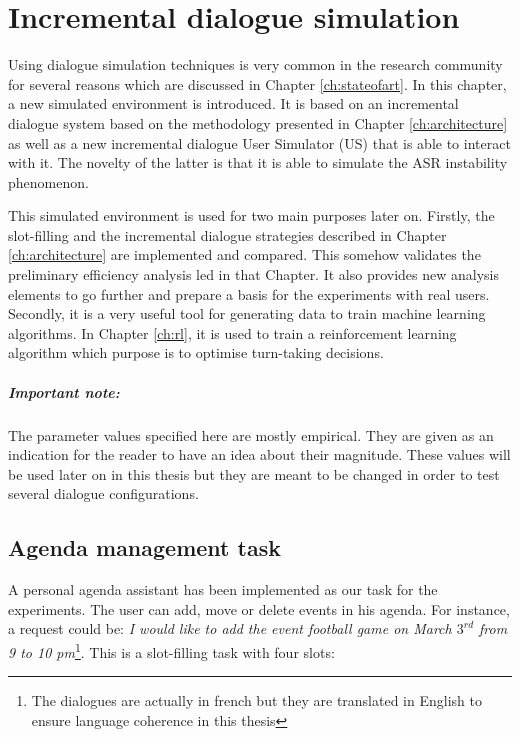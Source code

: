 \chapter{Incremental dialogue simulation}
\label{ch:simulation}
	
	Using dialogue simulation techniques is very common in the research community \cite{Eckert1997,Pietquin2013} for several reasons which are discussed in Chapter \ref{ch:stateofart}. In this chapter, a new simulated environment is introduced. It is based on an incremental dialogue system based on the methodology presented in Chapter \ref{ch:architecture} as well as a new incremental dialogue User Simulator (US) that is able to interact with it. The novelty of the latter is that it is able to simulate the ASR instability phenomenon.
	
	This simulated environment is used for two main purposes later on. Firstly, the slot-filling and the incremental dialogue strategies described in Chapter \ref{ch:architecture} are implemented and compared. This somehow validates the preliminary efficiency analysis led in that Chapter. It also provides new analysis elements to go further and prepare a basis for the experiments with real users. Secondly, it is a very useful tool for generating data to train machine learning algorithms. In Chapter \ref{ch:rl}, it is used to train a reinforcement learning algorithm which purpose is to optimise turn-taking decisions.
	
	\paragraph{Important note:} The parameter values specified here are mostly empirical. They are given as an indication for the reader to have an idea about their magnitude. These values will be used later on in this thesis but they are meant to be changed in order to test several dialogue configurations.

\section{Agenda management task}

	A personal agenda assistant has been implemented as our task for the experiments. The user can add, move or delete events in his agenda. For instance, a request could be: \textit{I would like to add the event football game on March $3^{rd}$ from 9 to 10 pm}\footnote{The dialogues are actually in french but they are translated in English to ensure language coherence in this thesis}. This is a slot-filling task with four slots:
    
